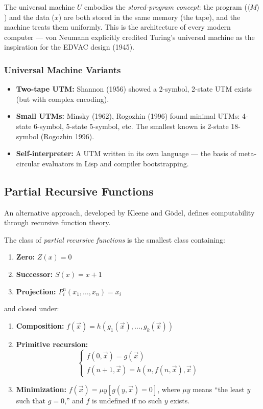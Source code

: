 The universal machine $U$ embodies the \emph{stored-program concept}: the program ($\langle M \rangle$) and the data ($x$) are both stored in the same memory (the tape), and the machine treats them uniformly. This is the architecture of every modern computer --- von Neumann explicitly credited Turing's universal machine as the inspiration for the EDVAC design (1945).

\subsubsection*{Universal Machine Variants}

\begin{itemize}
\item \textbf{Two-tape UTM:} Shannon (1956) showed a 2-symbol, 2-state UTM exists (but with complex encoding).
\item \textbf{Small UTMs:} Minsky (1962), Rogozhin (1996) found minimal UTMs: 4-state 6-symbol, 5-state 5-symbol, etc. The smallest known is 2-state 18-symbol (Rogozhin 1996).
\item \textbf{Self-interpreter:} A UTM written in its own language --- the basis of meta-circular evaluators in Lisp and compiler bootstrapping.
\end{itemize}

\subsection{Partial Recursive Functions}
\label{sec:computation:recursive}

An alternative approach, developed by Kleene and G\"odel, defines computability through recursive function theory.

\begin{definition}
The class of \emph{partial recursive functions} is the smallest class containing:
\begin{enumerate}
\item \textbf{Zero:} $Z(x) = 0$
\item \textbf{Successor:} $S(x) = x + 1$
\item \textbf{Projection:} $P_i^n(x_1, \ldots, x_n) = x_i$
\end{enumerate}
and closed under:
\begin{enumerate}
\item \textbf{Composition:} $f(\vec{x}) = h(g_1(\vec{x}), \ldots, g_k(\vec{x}))$
\item \textbf{Primitive recursion:}
\[
\begin{cases}
f(0, \vec{x}) = g(\vec{x}) \\
f(n+1, \vec{x}) = h(n, f(n, \vec{x}), \vec{x})
\end{cases}
\]
\item \textbf{Minimization:} $f(\vec{x}) = \mu y[g(y, \vec{x}) = 0]$, where $\mu y$ means ``the least $y$ such that $g=0$,'' and $f$ is undefined if no such $y$ exists.
\end{enumerate}
\end{definition}

